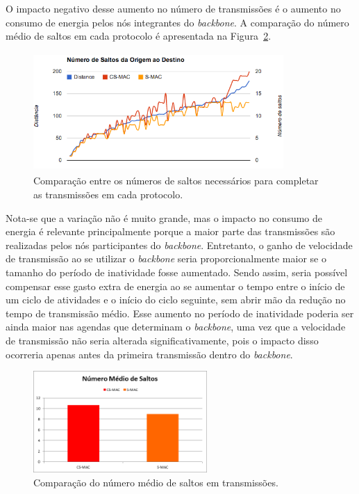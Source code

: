 O impacto negativo desse aumento no número de transmissões é o aumento no consumo de energia pelos nós integrantes do \emph{backbone}. A comparação do número médio de saltos em cada protocolo é apresentada na Figura~\ref{fig:averageNumberOfHops}. 

\begin{figure}[!htb]
\centering
\includegraphics[width=360px,height=170px]{./Pictures/NumberOfHopsComparison.png}
\caption{Comparação entre os números de saltos necessários para completar as transmissões em cada protocolo.} %
\label{fig:numberOfHopsComparison} %
\end{figure}

Nota-se que a variação não é muito grande, mas o impacto no consumo de energia é relevante principalmente porque a maior parte das transmissões são realizadas pelos nós participantes do \emph{backbone}.  Entretanto, o ganho de velocidade de transmissão ao se utilizar o \emph{backbone} seria proporcionalmente maior se o tamanho do período de inatividade fosse aumentado. Sendo assim, seria possível compensar esse gasto extra de energia ao se aumentar o tempo entre o início de um ciclo de atividades e o início do ciclo seguinte, sem abrir mão da redução no tempo de transmissão médio. Esse aumento no período de inatividade poderia ser ainda maior nas agendas que determinam o \emph{backbone}, uma vez que a velocidade de transmissão não seria alterada significativamente, pois o impacto disso ocorreria apenas antes da primeira transmissão dentro do \emph{backbone}.

\begin{figure}[!htb]
\centering
\includegraphics[width=250px,height=146px]{./Pictures/AverageNumberOfHops.png}
\caption{Comparação do número médio de saltos em transmissões.} %
\label{fig:averageNumberOfHops} %
\end{figure}